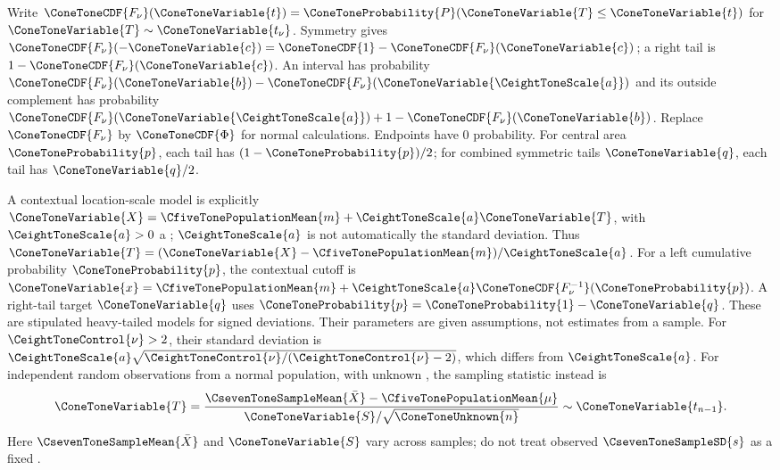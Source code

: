 Write $\ConeToneCDF{F_\nu}(\ConeToneVariable{t})=\ConeToneProbability{P}(\ConeToneVariable{T}\le \ConeToneVariable{t})$ for $\ConeToneVariable{T}\sim \ConeToneVariable{t_\nu}$.
Symmetry gives $\ConeToneCDF{F_\nu}(-\ConeToneVariable{c})=\ConeToneCDF{1}-\ConeToneCDF{F_\nu}(\ConeToneVariable{c})$; a right tail is $1-\ConeToneCDF{F_\nu}(\ConeToneVariable{c})$.
An interval has probability $\ConeToneCDF{F_\nu}(\ConeToneVariable{b})-\ConeToneCDF{F_\nu}(\ConeToneVariable{\CeightToneScale{a}})$ and its outside complement has probability
$\ConeToneCDF{F_\nu}(\ConeToneVariable{\CeightToneScale{a}})+1-\ConeToneCDF{F_\nu}(\ConeToneVariable{b})$. Replace $\ConeToneCDF{F_\nu}$ by $\ConeToneCDF{\Phi}$ for normal calculations.
Endpoints have 0 probability. For central area $\ConeToneProbability{p}$, each tail has $(1-\ConeToneProbability{p})/2$;
for combined symmetric tails $\ConeToneVariable{q}$, each tail has $\ConeToneVariable{q}/2$.

A contextual location-scale model is explicitly $\ConeToneVariable{X}=\CfiveTonePopulationMean{m}+\CeightToneScale{a}\ConeToneVariable{T}$, with $\CeightToneScale{a}>0$ a  ;
$\CeightToneScale{a}$ is not automatically the standard deviation. Thus $\ConeToneVariable{T}=(\ConeToneVariable{X}-\CfiveTonePopulationMean{m})/\CeightToneScale{a}$. For a left cumulative probability $\ConeToneProbability{p}$, the contextual cutoff is $\ConeToneVariable{x}=\CfiveTonePopulationMean{m}+\CeightToneScale{a}\ConeToneCDF{F_\nu^{-1}}(\ConeToneProbability{p})$. A right-tail target $\ConeToneVariable{q}$ uses $\ConeToneProbability{p}=\ConeToneProbability{1}-\ConeToneVariable{q}$.
These are stipulated heavy-tailed models for signed deviations. Their parameters are given assumptions, not estimates from a sample. For $\CeightToneControl{\nu}>2$, their standard deviation is $\CeightToneScale{a}\sqrt{\CeightToneControl{\nu}/(\CeightToneControl{\nu}-2)}$, which differs from $\CeightToneScale{a}$.
For independent random observations from a normal population, with unknown   ,
the sampling statistic instead is
\[
\ConeToneVariable{T}=\frac{\CsevenToneSampleMean{\bar X}-\CfiveTonePopulationMean{\mu}}{\ConeToneVariable{S}/\sqrt \ConeToneUnknown{n}}\sim \ConeToneVariable{t_{n-1}}.
\]
Here $\CsevenToneSampleMean{\bar X}$ and $\ConeToneVariable{S}$ vary across samples; do not treat observed $\CsevenToneSampleSD{s}$ as a fixed   .

